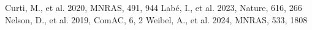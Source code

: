 \documentclass[twocolumn]{aastex631}
\begin{document}
\begin{thebibliography}{}
 Curti, M., et al. 2020, MNRAS, 491, 944
 Lab{\'e}, I., et al. 2023, Nature, 616, 266
 Nelson, D., et al. 2019, ComAC, 6, 2
 Weibel, A., et al. 2024, MNRAS, 533, 1808
\end{thebibliography}
\end{document}
